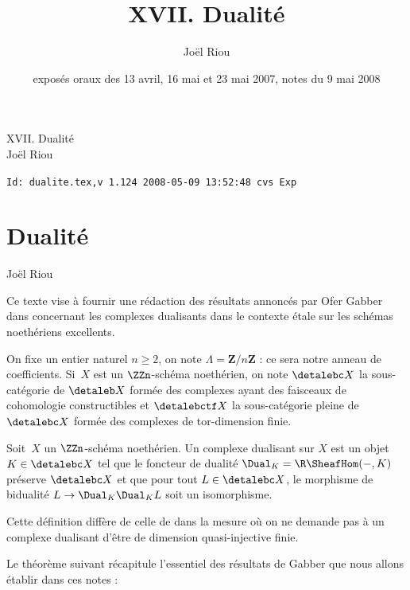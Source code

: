 \documentclass[10pt]{../fichiers-configuration-latex/smfart}
\author{Joël Riou}
\title{XVII. Dualité}
\date{exposés oraux des 13 avril, 16 mai et 23 mai 2007,
notes du 9 mai 2008}
\begin{document}
\begin{center}
XVII. Dualité\\
Joël Riou
\end{center}

\begin{center}
\verb$Id: dualite.tex,v 1.124 2008-05-09 13:52:48 cvs Exp $
\end{center}

\tableofcontents

\else
{}
\chapter{Dualité}
\begin{center}
Joël Riou
\end{center}
\fi



Ce texte vise à fournir une rédaction des résultats annoncés par Ofer
Gabber dans \cite{ABELIEN@Gabber} concernant les complexes dualisants dans
le contexte étale sur les schémas noethériens excellents. 

On fixe un entier naturel $n\geq 2$, on note
$\Lambda=\mathbf{Z}/n\mathbf{Z}$ : ce sera notre anneau de coefficients.
Si $X$ est un $\ZZn$-schéma noethérien, on note $\detalebc X$ la sous-catégorie
de $\detaleb X$ formée des complexes ayant des faisceaux de cohomologie
constructibles et $\detalebctf X$ la sous-catégorie pleine de $\detalebc X$ formée
des complexes de tor-dimension finie.

\begin{definition}\label{17-definition-complexe-dualisant}
Soit $X$ un $\ZZn$-schéma noethérien. Un complexe dualisant sur
$X$ est un objet $K\in\detalebc X$ tel que le foncteur de dualité 
$\Dual_K=\R\SheafHom(-,K)$ préserve $\detalebc X$ et que pour tout
$L\in\detalebc X$, le morphisme de bidualité $L\to\Dual_K\Dual_K L$ soit un
isomorphisme.
\end{definition}

Cette définition diffère de celle de  dans la mesure où on ne
demande pas à un complexe dualisant d'être de dimension quasi-injective
finie.

Le théorème suivant récapitule l'essentiel des résultats de Gabber que nous
allons établir dans ces notes :
\end{document}
